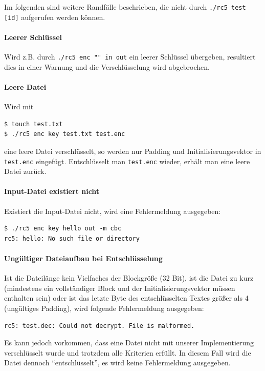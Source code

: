 \documentclass[course=erap]{aspdoc}
\begin{document}
Im folgenden sind weitere Randfälle beschrieben, die nicht durch \texttt{./rc5 test [id]} aufgerufen werden können.

\paragraph{Leerer Schlüssel} Wird z.B. durch \texttt{./rc5 enc "{}"{} in out} ein leerer Schlüssel übergeben, resultiert dies in einer Warnung und die Verschlüsselung wird abgebrochen.

\paragraph{Leere Datei} Wird mit 
\begin{verbatim}
$ touch test.txt
$ ./rc5 enc key test.txt test.enc
\end{verbatim} eine leere Datei verschlüsselt, so werden nur Padding und Initialisierungsvektor in \texttt{test.enc} eingefügt. Entschlüsselt man \texttt{test.enc} wieder, erhält man eine leere Datei zurück.

\paragraph{Input-Datei existiert nicht} Existiert die Input-Datei nicht, wird eine Fehlermeldung ausgegeben:
\begin{verbatim}
$ ./rc5 enc key hello out -m cbc
rc5: hello: No such file or directory
\end{verbatim}

\paragraph{Ungültiger Dateiaufbau bei Entschlüsselung} Ist die Dateilänge kein Vielfaches der Blockgröße (32 Bit), ist die Datei zu kurz (mindestens ein vollständiger Block und der Initialisierungsvektor müssen enthalten sein) oder ist das letzte Byte des entschlüsselten Textes größer als 4 (ungültiges Padding), wird folgende Fehlermeldung ausgegeben:
\begin{verbatim}
rc5: test.dec: Could not decrypt. File is malformed.
\end{verbatim}

Es kann jedoch vorkommen, dass eine Datei nicht mit unserer Implementierung verschlüsselt wurde und trotzdem alle Kriterien erfüllt. In diesem Fall wird die Datei dennoch ``entschlüsselt'', es wird keine Fehlermeldung ausgegeben.
\end{document}
